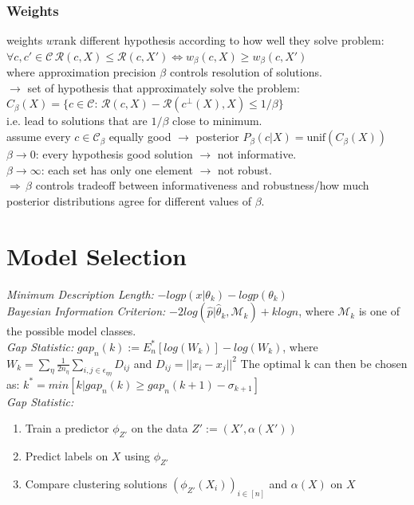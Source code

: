 \documentclass[9pt,parskip]{scrartcl}
\begin{document}
\begin{multicols*}{4}
\subsubsection*{Weights}
weights $w$rank different hypothesis according to how well they solve problem: \\
$\forall c, c' \in \mathcal{C} \, \mathcal{R}(c,X) \leq \mathcal{R}(c,X') \Leftrightarrow w_{\beta}(c,X) \geq w_{\beta}(c,X')$ \\
where approximation precision $\beta$ controls resolution of solutions. \\
$\to$ set of hypothesis that approximately solve the problem: \\$C_{\beta}(X)= \{c \in \mathcal{C} : \, \mathcal{R} (c,X) - \mathcal{R}(c^{\bot}(X),X) \leq 1/\beta \}$ \\
i.e. lead to solutions that are $1/\beta$ close to minimum. \\
assume every $c \in \mathcal{C}_{\beta}$ equally good $\to$ posterior $P_{\beta}(c|X) = \text{unif}(C_{\beta}(X))$ \\
$\beta \to 0$: every hypothesis good solution $\to$ not informative. \\
$\beta \to \infty$: each set has only one element $\to$ not robust. \\
$ \Rightarrow \, \beta$ controls tradeoff between informativeness and robustness/how much posterior distributions agree for different values of $\beta$.


\section*{Model Selection}
\textit{Minimum Description Length: } $-log p (x|\theta_k) - log p(\theta_k)$ \\

\textit{Bayesian Information Criterion:} $-2 log (\hat p | \hat \theta_k, \mathcal{M}_k)  + k log n$, where $\mathcal{M}_k$ is one of the possible model classes. \\
\textit{Gap Statistic:} $gap_n(k) := E_n^*[log(W_k)] - log(W_k)$, where $W_k = \sum_{\eta}\frac{1}{2n_{\eta}} \sum_{i,j \in \epsilon_{\eta \eta}} D_{ij}$ and $D_{ij} = ||x_i -x_j||^2$
The optimal k can then be chosen as: $k^* = min[k|gap_n(k) \geq gap_n(k+1) - \sigma_{k+1}]$ \\

\textit{Gap Statistic:}
\begin{enumerate}
    \item Train a predictor $\phi_{Z'}$ on the data $Z' := (X', \alpha(X'))$
    \item Predict labels on $X$ using $\phi_{Z'}$
    \item Compare clustering solutions $(\phi_{Z'}(X_i))_{i \in [n]}$ and $\alpha(X)$ on $X$
\end{enumerate}


\end{multicols*}
\end{document}
